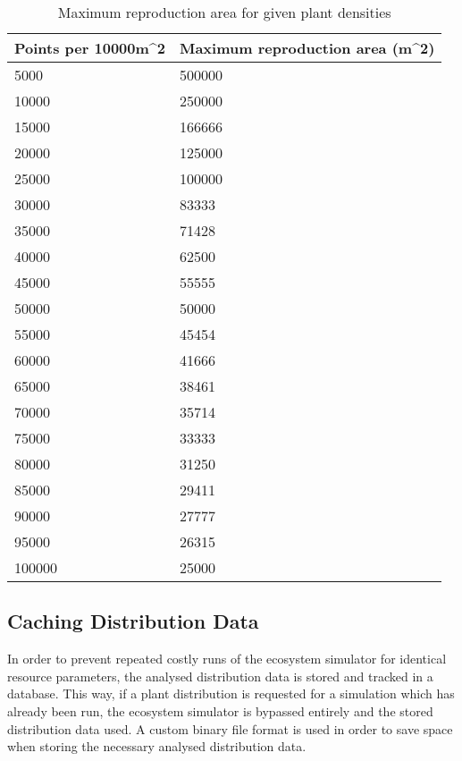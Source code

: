 {\begin{table}[]
  \centering
	    \begin{tabular}{|p{7cm}|p{8cm}|}
		\hline
		\textbf{Points per 10000m^2} & \textbf{Maximum reproduction area (m^2)}\\
		\hline
		5000	  &  500000\\
		\hline
		10000 &	250000\\
		\hline
		15000 &	166666\\
		\hline
		20000 &	125000\\
		\hline
		25000 &	100000\\
		\hline
		30000 &	83333\\
		\hline
		35000 &	71428\\
		\hline
		40000 &	62500\\
		\hline
		45000 &	55555\\
		\hline
		50000 &	50000\\
		\hline
		55000 &	45454\\
		\hline
		60000 &	41666\\
		\hline
		65000 &	38461\\
		\hline
		70000 &	35714\\
		\hline
		75000 &	33333\\
		\hline
		80000 &	31250\\
		\hline
		85000 &	29411\\
		\hline
		90000 &	27777\\
		\hline
		95000 &	26315\\
		\hline
		100000 & 25000 \\ 
		\hline
		\end{tabular}
		\caption{Maximum reproduction area for given plant densities}
	  \label{tab:maximum_reproduction_areas}
\end{table}

\subsection{Caching Distribution Data}

In order to prevent repeated costly runs of the ecosystem simulator for identical resource parameters, the analysed distribution data is stored and tracked in a database. This way, if a plant distribution is requested for a simulation which has already been run, the ecosystem simulator is bypassed entirely and the stored distribution data used. A custom binary file format is used in order to save space when storing the necessary analysed distribution data.

}
